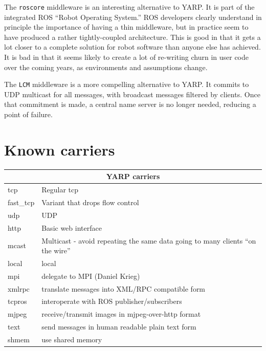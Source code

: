 \documentclass[letterpaper]{article}
\begin{document}
The {\tt roscore} middleware \cite{quigley2009ros} is an
interesting alternative to YARP.  
It is part of the integrated ROS ``Robot Operating
System.''  ROS developers clearly understand in principle the
importance of having a thin middleware, but in practice seem to have
produced a rather tightly-coupled architecture.  This is good in that
it gets a lot closer to a complete solution for robot software than
anyone else has achieved.  It is bad in that it seems likely to create
a lot of re-writing churn in user code over the coming years, as
environments and assumptions change.

The {\tt LCM} middleware \cite{huang2010lcm} is a more compelling
alternative to YARP.  It commits to UDP multicast for all messages,
with broadcast messages filtered by clients.  Once that commitment is
made, a central name server is no longer needed, reducing a point of
failure.




\clearpage
\newpage


\section{Known carriers}



\begin{tabular}{|l|p{7cm}|}
\hline
\multicolumn{2}{|c|}{YARP carriers} \\
\hline
tcp & Regular tcp \\
fast\_tcp & Variant that drops flow control \\
udp & UDP \\
http & Basic web interface \\
mcast & Multicast - avoid repeating the same data going
to many clients ``on the wire''  \\
local & local \\
mpi & delegate to MPI (Daniel Krieg) \\
xmlrpc & translate messages into XML/RPC compatible form \\
tcpros & interoperate with ROS publisher/subscribers \\
mjpeg & receive/transmit images in mjpeg-over-http format \\
text & send messages in human readable plain text form \\
shmem & use shared memory \\
\hline
\end{tabular}
\end{document}
